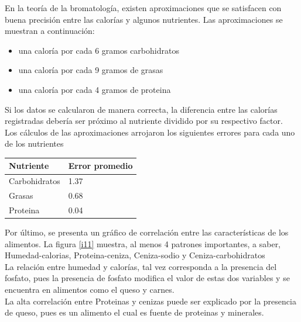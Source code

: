 \documentclass[12pt, letterpaper]{article}
\begin{document}
En la teoría de la bromatología, existen aproximaciones que se satisfacen con buena precisión entre las calorías y algunos nutrientes. Las aproximaciones se muestran a continuación:\\

\begin{itemize}
\item una caloría por cada 6 gramos carbohidratos
\item una caloría por cada 9 gramos de grasas
\item una caloría por cada 4 gramos de proteina
\end{itemize}

Si los datos se calcularon de manera correcta, la diferencia entre las calorías registradas debería ser próximo al nutriente dividido por su respectivo factor.\\

Los cálculos de las aproximaciones arrojaron los siguientes errores para cada uno de los nutrientes\\

\begin{table}[htbp]
\begin{center}
\begin{tabular}{|l|l|}
\hline
Nutriente&Error promedio\\ \hline\hline
Carbohidratos&1.37\\ \hline
Grasas&0.68\\ \hline
Proteina&0.04\\ \hline
\end{tabular}
\end{center}
\end{table}

Por último, se presenta un gráfico de correlación entre las características de los alimentos. La figura \ref{i11} muestra, al menos 4 patrones importantes, a saber, Humedad-calorias, Proteina-ceniza, Ceniza-sodio y Ceniza-carbohidratos\\

La relación entre humedad y calorías, tal vez corresponda a la presencia del fosfato, pues la presencia de fosfato modifica el valor de estas dos variables y se encuentra en alimentos como el queso y carnes.\\

La alta correlación entre Proteinas y cenizas puede ser explicado por la presencia de queso, pues es un alimento el cual es fuente de proteinas y minerales.\\
\end{document}
